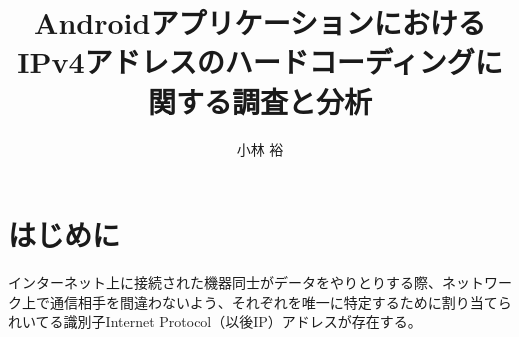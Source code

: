 \documentclass[a4j]{jarticle}
\date{}
\begin{document}

\makeatletter %
	\def\@thesis{令和2年度 東邦大学理学部情報科学科 卒業研究}
	\def\id#1{\def\@id{#1}}
	\def\department#1{\def\@department{#1}}
	
	\def\@maketitle{
		\begin{center}
			\vspace{10mm}
			{\large \@thesis \par}	%
			\vspace{50mm}
			{\huge\bf \@title \par}	%
			\vspace{15mm}
			{\Large 学籍番号　\@id \par}	%
			\vspace{5mm}
			{\Large \@author \par}	%
			\vspace{50mm}
		\end{center}
		\begin{flushright}
			{\large 金岡研究室}
		\end{flushright}
	}
\makeatother

\title{AndroidアプリケーションにおけるIPv4アドレスのハードコーディングに関する調査と分析} %
\id{5517044} %
\author{小林 裕} %
\maketitle{\title} %
\thispagestyle{empty} %
\newpage %

\tableofcontents %





\newpage
\section{はじめに} 
インターネット上に接続された機器同士がデータをやりとりする際、ネットワーク上で通信相手を間違わないよう、それぞれを唯一に特定するために割り当てられいてる識別子Internet Protocol（以後IP）アドレスが存在する。
\end{document}
